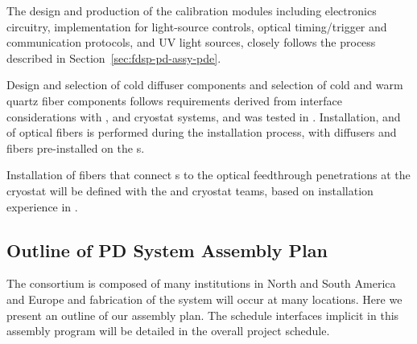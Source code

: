 The design and production of the calibration modules including electronics circuitry,   implementation for light-source controls, optical timing/trigger and  communication protocols, and UV light sources, closely follows the process described in Section~\ref{sec:fdsp-pd-assy-pde}.

Design and selection of cold diffuser components and selection of cold and warm quartz fiber components follows requirements derived from interface considerations with ,   and cryostat systems,  
and was tested in .
Installation,  and  of optical fibers is performed during the  installation process, with diffusers and  fibers pre-installed on the s.

Installation of fibers that connect s %
to the optical feedthrough penetrations at the cryostat will be defined with the  and cryostat teams, based on installation experience in . 

\subsection{Outline of PD System Assembly Plan}
\label{sec:fdsp-pd-assy-Assby-plan}

The   consortium is composed of many institutions in North and South America and Europe and fabrication of the system will occur at many locations. %
Here we present an outline of our assembly %
plan.  The schedule interfaces implicit in this assembly program will be detailed in the overall project schedule.

